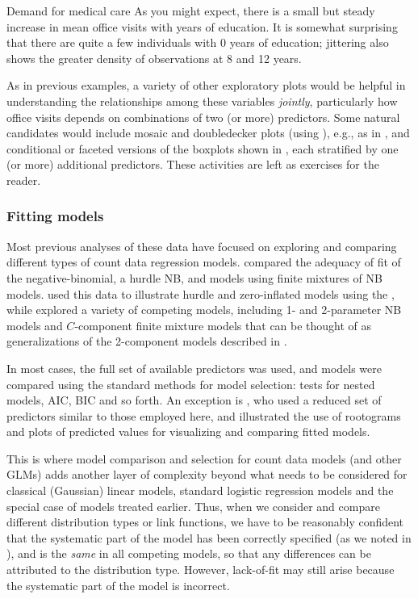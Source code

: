 \documentclass[11pt]{book}\usepackage[]{graphicx}\usepackage[]{color}
\newenvironment{knitrout}{}{} %
\renewenvironment{knitrout}{\small\renewcommand{\baselinestretch}{.85}}{} %
\begin{document}
\begin{Example}[nmes1]{Demand for medical care}
\begin{knitrout}
\end{knitrout}
\noindent As you might expect, there is a small but steady increase in mean office visits with
years of education.  It is somewhat surprising that there are quite a few individuals
with 0 years of education; jittering also shows the greater density of observations at
8 and 12 years.

As in previous examples, a variety of other exploratory plots would be helpful in understanding
the relationships among these variables \emph{jointly}, particularly how office visits depends on 
combinations of two (or more) predictors.  Some natural candidates would include
mosaic and doubledecker plots (using ), e.g., as in ,
and conditional or faceted versions of the boxplots shown in , each
stratified by one (or more) additional predictors. These activities are left as exercises for
the reader.

\end{Example}

\subsubsection{Fitting models}
Most previous analyses of these data have focused on exploring and comparing different types of 
count data regression models.  \citet{DebTrivedi:1997} compared the adequacy of fit of the
negative-binomial, a hurdle NB, and models using finite mixtures of NB models.
\citet{Zeileis-etal:2008} used this data to illustrate hurdle and zero-inflated models using
the , while \citet{CameronTrivedi:1998,CameronTrivedi:2013} explored a variety of competing
models, including 1- and 2-parameter NB models and $C$-component finite mixture models 
that can be thought of as generalizations of the 2-component models described in .

In most cases, the full set of available predictors was used, and models were compared using the
standard methods for model selection: \LR tests for nested models, AIC, BIC and so forth.
An exception is \citet{KleiberZeileis:2014}, who used a reduced set of predictors similar to
those employed here, and illustrated the use of rootograms and plots of predicted values
for visualizing and comparing fitted models.

This is where model comparison and selection for count data models (and other GLMs) adds another
layer of complexity beyond what needs to be considered for classical (Gaussian) linear models,
standard logistic regression models and the special case of \loglin models treated earlier.
Thus, when we consider and compare different distribution types or link functions, we have to
be reasonably confident that the systematic part of the model has been correctly specified
(as we noted in ), and is the \emph{same} in all competing models, so that
any differences can be attributed to the distribution type.  However, lack-of-fit may still
arise because the systematic part of the model is incorrect.
\end{document}
